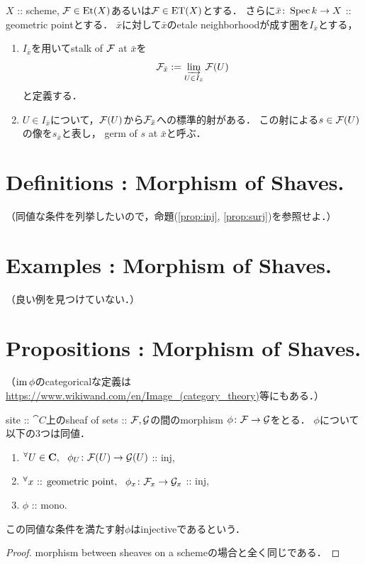 \documentclass[a4paper]{jsarticle}
\begin{document}
\begin{Def}
    $X$ :: scheme,
    $\mathcal{F} \in \mathrm{Et}(X)$あるいは$\mathcal{F} \in \mathrm{ET}(X)$とする．
    さらに$\bar{x} \colon \operatorname{Spec} k \to X$ :: geometric pointとする．
    $\bar{x}$に対して$\bar{x}$のetale neighborhoodが成す圏を$I_{\bar{x}}$とする，

    \begin{enumerate}[label=(\roman*)]
        \item 
        $I_{\bar{x}}$を用いてstalk of $\mathcal{F}$ at $\bar{x}$を
        \[ \mathcal{F}_{\bar{x}}:=\varinjlim_{U \in I_{\bar{x}}} \mathcal{F}(U) \]
        と定義する．

        \item
        $U \in I_{\bar{x}}$について，$\mathcal{F}(U)$から$\mathcal{F}_{\bar{x}}$への標準的射がある．
        この射による$s \in \mathcal{F}(U)$の像を$s_{\bar{x}}$と表し，
        germ of $s$ at $\bar{x}$と呼ぶ．
    \end{enumerate}
\end{Def}

\section{Definitions : Morphism of Shaves.}
\begin{Def}
    （同値な条件を列挙したいので，命題(\ref{prop:inj}, \ref{prop:surj})を参照せよ．）
\end{Def}

\section{Examples : Morphism of Shaves.}
（良い例を見つけていない．）

\section{Propositions : Morphism of Shaves.}
\begin{Def}
    （$\operatorname{im} \phi$のcategoricalな定義は\url{https://www.wikiwand.com/en/Image_(category_theory)}等にもある．）
\end{Def}

\begin{Prop} \label{prop:inj}
    site :: $\cat{C}$上のsheaf of sets :: $\mathcal{F}, \mathcal{G}$の間のmorphism
    $\phi \colon \mathcal{F} \to \mathcal{G}$をとる．
    $\phi$について以下の$3$つは同値．
    \begin{enumerate}
        \item ${}^{\forall} U \in \mathbf{C},~~ \phi_{U} \colon \mathcal{F}(U) \to \mathcal{G}(U)$ :: inj,
        \item ${}^{\forall} x \text{ :: geometric point},~~ \phi_{x} \colon \mathcal{F}_x \to \mathcal{G}_x$ :: inj,
        \item $\phi$ :: mono.
    \end{enumerate}
    この同値な条件を満たす射$\phi$はinjectiveであるという．
\end{Prop}
\begin{proof}
    morphism between sheaves on a schemeの場合と全く同じである．
\end{proof}
\end{document}
